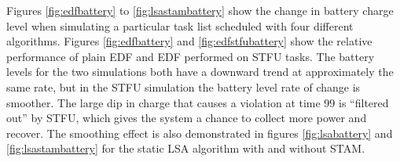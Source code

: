 Figures \ref{fig:edfbattery} to \ref{fig:lsastambattery} show the change in battery charge level when simulating a particular task list scheduled with four different algorithms.  
Figures \ref{fig:edfbattery} and \ref{fig:edfstfubattery} show the relative performance of plain \textsc{EDF} and \textsc{EDF} performed on \textsc{STFU} tasks.  The battery levels for the two simulations both have a downward trend at approximately the same rate, but in the \textsc{STFU} simulation the battery level rate of change is smoother.  
The large dip in charge that causes a violation at time 99 is ``filtered out'' by \textsc{STFU}, which gives the system a chance to collect more power and recover.  The smoothing effect is also demonstrated in figures \ref{fig:lsabattery} and \ref{fig:lsastambattery} for the static \textsc{LSA} algorithm with and without \textsc{STAM}.




